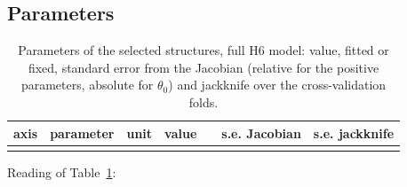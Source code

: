 \documentclass[10pt,a4paper]{article}
\numberwithin{equation}{section}
\begin{document}
\subsection{Parameters}
\begin{table}[H]\centering\small
\caption{Parameters of the selected structures, full H6 model: value, fitted or fixed, standard error from the Jacobian (relative for the positive parameters, absolute for $\theta_0$) and jackknife over the cross-validation folds.}\label{tab:params}
\begin{tabular}{lllrlrr}\toprule
axis & parameter & unit & value & & s.e. Jacobian & s.e. jackknife \\ \midrule
\\ \bottomrule
\end{tabular}\end{table}
Reading of Table~\ref{tab:params}:
\end{document}
